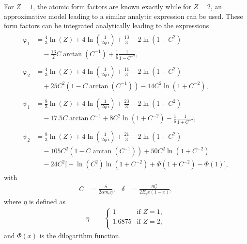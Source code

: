 For $Z=1$, the atomic form factors are known exactly while for $Z=2$, an approximative model leading to a similar analytic expression can be used.
These form factors can be integrated analytically leading to the expressions \cite{RevModPhys.46.815}
%
\begingroup
\allowdisplaybreaks
\begin{align}
	\begin{split}
		\varphi_1 &= \frac{4}{3} \ln(Z) + 4 \ln\left(\frac{1}{2 \eta \alpha}\right) + \frac{13}{3} - 2 \ln(1 + C^2) \\&\quad- \frac{13}{2} C \arctan(C^{-1}) + \frac{1}{6}\frac{1}{1 - C^{-2}},
	\end{split}
	\\[2ex]
	\begin{split}
		\varphi_2 &= \frac{4}{3} \ln(Z) + 4 \ln\left(\frac{1}{2 \eta \alpha}\right) + \frac{11}{3} - 2 \ln(1 + C^2) \\&\quad+ 25 C^2 (1 - C \arctan(C^{-1})) - 14 C^2 \ln(1 + C^{-2}),
	\end{split}
	\\[2ex]
	\begin{split}
		\psi_1 &= \frac{8}{3} \ln(Z) + 4 \ln\left(\frac{1}{2 \eta \alpha}\right) + \frac{23}{3} - 2 \ln (1 + C^2) \\&\quad- 17.5 C \arctan{C^{-1}} + 8 C^2 \ln(1 + C^{-2}) - \frac{1}{6}\frac{1}{1 + C^{-2}},
	\end{split}
	\\[2ex]
	\begin{split}
		\psi_2 &= \frac{8}{3} \ln(Z) + 4 \ln\left(\frac{1}{2 \eta \alpha}\right) + \frac{21}{3} - 2 \ln (1 + C^2) \\&\quad- 105 C^2 (1 - C \arctan(C^{-1})) + 50 C^2 \ln(1 + C^{-2}) \\&\quad- 24 C^2 \biggl[ - \ln(C^2) \ln(1 + C^{-2}) + \Phi(1 + C^{-2}) - \Phi(1) \biggr],
	\end{split}
\end{align}
\endgroup
%
with
%
\begin{align*}
	C &= \frac{\delta}{2 \alpha m_e \eta}, & \delta &= \frac{m_e^2}{2 E_{\gamma} x (1-x)},
\end{align*}
%
where $\eta$ is defined as
%
\begin{align*}
	\eta &= 
	\begin{cases}
		1 & \text{if $Z = 1$},\\
		1.6875 & \text{if $Z = 2$},\\
	\end{cases}
\end{align*}
%
and $\Phi(x)$ is the dilogarithm function.

